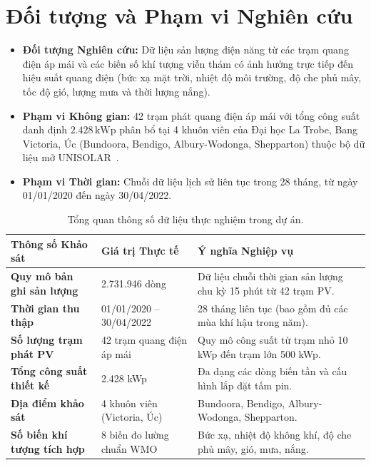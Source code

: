 \documentclass[12pt, a4paper]{report}
\begin{document}
\section{Đối tượng và Phạm vi Nghiên cứu}
\label{sec:phamvi}

\begin{itemize}[noitemsep]
    \item \textbf{Đối tượng Nghiên cứu:} Dữ liệu sản lượng điện năng từ các trạm quang điện áp mái và các biến số khí tượng viễn thám có ảnh hưởng trực tiếp đến hiệu suất quang điện (bức xạ mặt trời, nhiệt độ môi trường, độ che phủ mây, tốc độ gió, lượng mưa và thời lượng nắng).
    \item \textbf{Phạm vi Không gian:} 42 trạm phát quang điện áp mái với tổng công suất danh định $2.428\,\text{kWp}$ phân bổ tại 4 khuôn viên của Đại học La Trobe, Bang Victoria, Úc (Bundoora, Bendigo, Albury-Wodonga, Shepparton) thuộc bộ dữ liệu mở UNISOLAR~\cite{wimalaratne2022unisolar}.
    \item \textbf{Phạm vi Thời gian:} Chuỗi dữ liệu lịch sử liên tục trong 28 tháng, từ ngày 01/01/2020 đến ngày 30/04/2022.
\end{itemize}

\begin{table}[H]
\centering
\small
\renewcommand{\arraystretch}{1.25}
\begin{tabularx}{\textwidth}{@{} l l X @{}}
\toprule
\textbf{Thông số Khảo sát} & \textbf{Giá trị Thực tế} & \textbf{Ý nghĩa Nghiệp vụ} \\
\midrule
\textbf{Quy mô bản ghi sản lượng} & 2.731.946 dòng & Dữ liệu chuỗi thời gian sản lượng chu kỳ 15 phút từ 42 trạm PV. \\
\textbf{Thời gian thu thập} & 01/01/2020 -- 30/04/2022 & 28 tháng liên tục (bao gồm đủ các mùa khí hậu trong năm). \\
\textbf{Số lượng trạm phát PV} & 42 trạm quang điện áp mái & Quy mô công suất từ trạm nhỏ 10 kWp đến trạm lớn 500 kWp. \\
\textbf{Tổng công suất thiết kế} & 2.428 kWp & Đa dạng các dòng biến tần và cấu hình lắp đặt tấm pin. \\
\textbf{Địa điểm khảo sát} & 4 khuôn viên (Victoria, Úc) & Bundoora, Bendigo, Albury-Wodonga, Shepparton. \\
\textbf{Số biến khí tượng tích hợp} & 8 biến đo lường chuẩn WMO & Bức xạ, nhiệt độ không khí, độ che phủ mây, gió, mưa, nắng. \\
\bottomrule
\end{tabularx}
\caption{Tổng quan thông số dữ liệu thực nghiệm trong dự án.}
\label{tab:dataset_summary}
\end{table}
\end{document}
